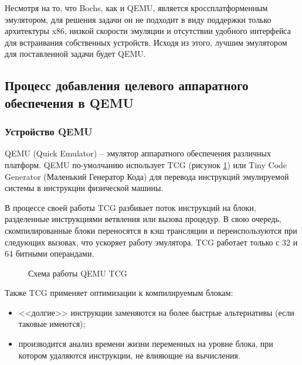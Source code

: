 Несмотря на то, что Bochs, как и QEMU, является кроссплатформенным эмулятором,
для решения задачи он не подходит в виду поддержки только архитектуры x86,
низкой скорости эмуляции и отсутствии удобного интерфейса для встраивания
собственных устройств.
Исходя из этого, лучшим эмулятором для поставленной задачи будет QEMU.

\subsection{Процесс добавления целевого аппаратного обеспечения в QEMU}\label{sec:ch1/sec4/sub3}


\subsubsection{Устройство QEMU}\label{sec:ch1/sec4/sub3/sub1}

QEMU (Quick Emulator) -- эмулятор аппаратного обеспечения различных платформ.
QEMU по-умолчанию использует TCG (рисунок \ref{fig:qemu-tcg}) или Tiny Code Generator (Маленький Генератор Кода) для
перевода инструкций эмулируемой системы в инструкции физической машины.

В процессе своей работы TCG разбивает поток инструкций на блоки, разделенные инструкциями
ветвления или вызова процедур.
В свою очередь, скомпилированные блоки переносятся в кэш трансляции и переиспользуются при следующих
вызовах, что ускоряет работу эмулятора.
TCG работает только с 32 и 64 битными операндами.

\begin{figure}[!htbp]
    \centering
    
    \caption{Схема работы QEMU TCG}\label{fig:qemu-tcg}
\end{figure}

Также TCG применяет оптимизации к компилируемым блокам:
\begin{itemize}
    \item <<долгие>> инструкции заменяются на более быстрые альтернативы (если таковые имеются);
    \item производится анализ времени жизни переменных на уровне блока, при котором
          удаляются инструкции, не влияющие на вычисления.
\end{itemize}

